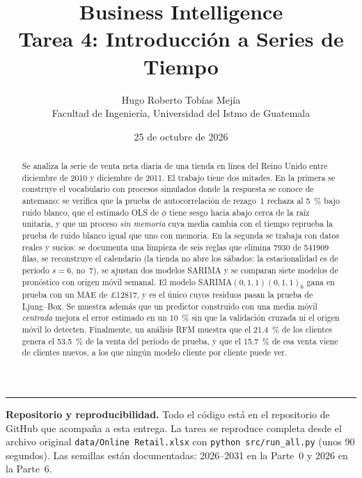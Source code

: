 \documentclass[11pt]{article}
\title{\textbf{Business Intelligence}\\[0.3em]
       Tarea 4: Introducci\'on a Series de Tiempo}
\author{Hugo Roberto Tob\'ias Mej\'ia\\
        \small Facultad de Ingenier\'ia, Universidad del Istmo de Guatemala}
\date{25 de octubre de 2026}
\newcommand{\gbp}{\pounds}
\begin{document}
\maketitle

\begin{abstract}
\noindent
Se analiza la serie de venta neta diaria de una tienda en l\'inea del Reino
Unido entre diciembre de 2010 y diciembre de 2011. El trabajo tiene dos
mitades. En la primera se construye el vocabulario con procesos simulados
donde la respuesta se conoce de antemano: se verifica que la prueba de
autocorrelaci\'on de rezago~1 rechaza al \SI{5}{\percent} bajo ruido blanco,
que el estimado OLS de $\phi$ tiene sesgo hacia abajo cerca de la ra\'iz
unitaria, y que un proceso \emph{sin memoria} cuya media cambia con el tiempo
reprueba la prueba de ruido blanco igual que uno con memoria. En la segunda
se trabaja con datos reales y sucios: se documenta una limpieza de seis
reglas que elimina \num{7930} de \num{541909} filas, se reconstruye el
calendario (la tienda no abre los s\'abados: la estacionalidad es de
per\'iodo $s=6$, no~7), se ajustan dos modelos SARIMA y se comparan siete
modelos de pron\'ostico con origen m\'ovil semanal. El modelo
SARIMA$(0,1,1)(0,1,1)_6$ gana en prueba con un MAE de \gbp\num{12817}, y es
el \'unico cuyos residuos pasan la prueba de Ljung--Box. Se muestra adem\'as
que un predictor construido con una media m\'ovil \emph{centrada} mejora el
error estimado en un \SI{10}{\percent} sin que la validaci\'on cruzada ni el
origen m\'ovil lo detecten. Finalmente, un an\'alisis RFM muestra que el
\SI{21.4}{\percent} de los clientes genera el \SI{53.5}{\percent} de la venta
del per\'iodo de prueba, y que el \SI{15.7}{\percent} de esa venta viene de
clientes nuevos, a los que ning\'un modelo cliente por cliente puede ver.
\end{abstract}

\vspace{-0.6em}
\noindent\rule{\textwidth}{0.4pt}
\small
\textbf{Repositorio y reproducibilidad.} Todo el c\'odigo est\'a en el
repositorio de GitHub que acompa\~na a esta entrega. La tarea se reproduce
completa desde el archivo original \texttt{data/Online Retail.xlsx} con
\texttt{python src/run\_all.py} (unos 90 segundos). Las semillas est\'an
documentadas: \num{2026}--\num{2031} en la Parte~0 y \num{2026} en la
Parte~6.
\end{document}
